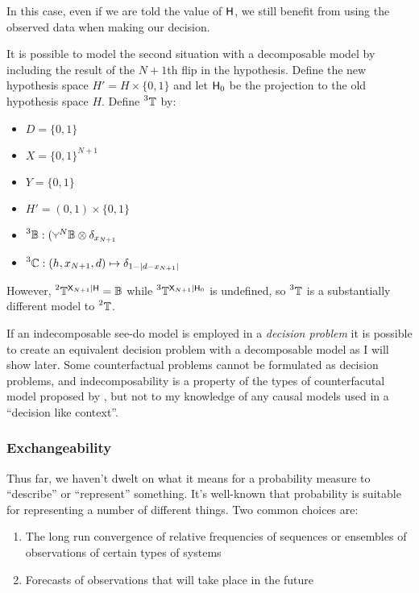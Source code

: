 In this case, even if we are told the value of $\mathsf{H}$, we still benefit from using the observed data when making our decision.

It is possible to model the second situation with a decomposable model by including the result of the $N+1$th flip in the hypothesis. Define the new hypothesis space $H'=H\times\{0,1\}$ and let $\mathsf{H}_0$ be the projection to the old hypothesis space $H$. Define $\prescript{3}{}{\ensuremath{\mathbb{T}}}$ by:

\begin{itemize}
    \item $D=\{0,1\}$
    \item $X=\{0,1\}^{N+1}$
    \item $Y=\{0,1\}$
    \item $H'=(0,1)\times\{0,1\}$
    \item $\prescript{3}{}{\kernel{B}}:(\splitter{0.1}^N\kernel{B}\otimes \delta_{x_{N+1}}$
    \item $\prescript{3}{}{\ensuremath{\mathbb{C}}}:(h,x_{N+1},d)\mapsto \delta_{1-|d-x_{N+1}|}$
\end{itemize}

However, $\prescript{2}{}{\ensuremath{\mathbb{T}}}^{\mathsf{X}_{N+1}|\mathsf{H}} = \mathbb{B}$ while $\prescript{3}{}{\ensuremath{\mathbb{T}}}^{\mathsf{X}_{N+1}|\mathsf{H}_0}$ is undefined, so $\prescript{3}{}{\ensuremath{\mathbb{T}}}$ is a substantially different model to $\prescript{2}{}{\ensuremath{\mathbb{T}}}$.

If an indecomposable see-do model is employed in a \emph{decision problem} it is possible to create an equivalent decision problem with a decomposable model as I will show later. Some counterfactual problems cannot be formulated as decision problems, and indecomposability is a property of the types of counterfacutal model proposed by \citet{pearl_causality:_2009}, but not to my knowledge of any causal models used in a ``decision like context''.

\subsubsection{Exchangeability}

Thus far, we haven't dwelt on what it means for a probability measure to ``describe'' or ``represent'' something. It's well-known that probability is suitable for representing a number of different things. Two common choices are:

\begin{enumerate}
    \item The long run convergence of relative frequencies of sequences or ensembles of observations of certain types of systems
    \item Forecasts of observations that will take place in the future
\end{enumerate}

